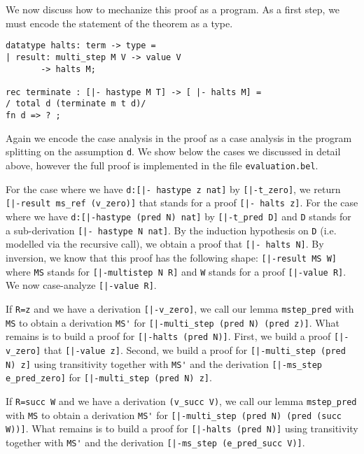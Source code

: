 We now discuss how to mechanize this proof as a program. As a first step, we
must encode the statement of the theorem as a type.

\begin{lstlisting}
datatype halts: term -> type =
| result: multi_step M V -> value V
       -> halts M;

rec terminate : [|- hastype M T] -> [ |- halts M] =
/ total d (terminate m t d)/
fn d => ? ;
\end{lstlisting}

Again we encode the case analysis in the proof as a case analysis in the program
splitting on the assumption \lstinline!d!. We show below the cases we discussed
in detail above, however the full proof is implemented in the file
\lstinline!evaluation.bel!.

For the case where we have \lstinline!d:[|- hastype z nat]! by
\lstinline![|-t_zero]!, we return \lstinline![|-result ms_ref (v_zero)]! that
stands for a proof \lstinline![|- halts z]!. For the case where we have
\lstinline!d:[|-hastype (pred N) nat]! by \lstinline![|-t_pred D]! and
\lstinline!D! stands for a sub-derivation \lstinline![|- hastype N nat]!. By the
induction hypothesis on \lstinline!D! (i.e. modelled via the recursive call), we
obtain a proof that \lstinline![|- halts N]!.  By inversion, we know that this
proof has the following shape: \lstinline![|-result MS W]! where \lstinline!MS!
stands for \lstinline![|-multistep N R]! and \lstinline!W!
stands for a proof \lstinline![|-value R]!. We now case-analyze
\mbox{\lstinline![|-value R]!}. 

If \lstinline!R=z! and we have a derivation
\lstinline![|-v_zero]!, we call our lemma \lstinline!mstep_pred! with
\lstinline!MS! to obtain a derivation \lstinline!MS'! for
\lstinline![|-multi_step (pred N) (pred z)]!. What remains is to build a proof
for \lstinline![|-halts (pred N)]!. First, we build a proof \lstinline![|-v_zero]!
that \lstinline![|-value z]!. Second, we build a proof for
\lstinline![|-multi_step (pred N) z]! using transitivity together with
\lstinline!MS'! and the derivation \lstinline![|-ms_step e_pred_zero]! for
\mbox{\lstinline![|-multi_step (pred N) z]!}.

If \lstinline!R=succ W! and we have a derivation 
\lstinline!(v_succ V)!, we call our lemma \lstinline!mstep_pred! with
\lstinline!MS! to obtain a derivation \lstinline!MS'! for 
\lstinline![|-multi_step (pred N) (pred (succ W))]!. What remains is to build a proof
for \lstinline![|-halts (pred N)]! using transitivity together with
\lstinline!MS'! and the derivation 
\lstinline![|-ms_step (e_pred_succ V)]!. 

